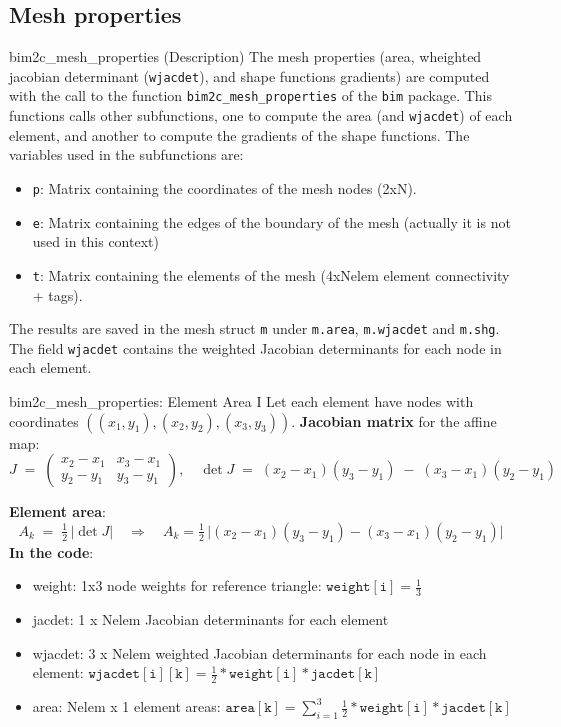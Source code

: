 \documentclass[aspectratio=54,xcolor=dvipsnames]{beamer}
\begin{document}
\subsection{Mesh properties}
\begin{frame}{bim2c\_mesh\_properties (Description)}
    The mesh properties (area, wheighted jacobian determinant (\texttt{wjacdet}), and shape functions gradients) are computed with the call to the function \texttt{bim2c\_mesh\_properties} of the \texttt{bim} package. This functions calls other subfunctions, one to compute the area (and \texttt{wjacdet}) of each element, and another to compute the gradients of the shape functions.
    The variables used in the subfunctions are:
    \begin{itemize}
        \item \texttt{p}: Matrix containing the coordinates of the mesh nodes (2xN).
        \item \texttt{e}: Matrix containing the edges of the boundary of the mesh (actually it is not used in this context)
        \item \texttt{t}: Matrix containing the elements of the mesh (4xNelem element connectivity + tags).
    \end{itemize}
    The results are saved in the mesh struct \texttt{m} under \texttt{m.area}, \texttt{m.wjacdet} and \texttt{m.shg}. The field \texttt{wjacdet} contains the weighted Jacobian determinants for each node in each element.
\end{frame}

\begin{frame}{bim2c\_mesh\_properties: Element Area I}
\small
Let each element have nodes with coordinates $((x_1,y_1), (x_2,y_2), (x_3,y_3))$.
\textbf{Jacobian matrix} for the affine map:
\[
    J \;=\;
    \begin{pmatrix}
        x_2 - x_1 & x_3 - x_1 \\[3pt]
        y_2 - y_1 & y_3 - y_1
    \end{pmatrix},
    \quad
    \det J \;=\;(x_2 - x_1)(y_3 - y_1)\;-\;(x_3 - x_1)(y_2 - y_1)
\]

\textbf{Element area}:
\[
    A_k \;=\;\tfrac12\,|\det J|
    \quad\Longrightarrow\quad
    A_k = \tfrac12\,\bigl|(x_2-x_1)(y_3-y_1)-(x_3-x_1)(y_2-y_1)\bigr|
\]
\textbf{In the code}:
\begin{itemize}
    \item weight: 1x3 node weights for reference triangle: $\mathtt{weight[i]} = \tfrac13$ 
    \item jacdet: 1 x Nelem Jacobian determinants for each element
    \item wjacdet: 3 x Nelem weighted Jacobian determinants for each node in each element: $\mathtt{wjacdet[i][k]} = \tfrac12 * \mathtt{weight[i]} * \mathtt{jacdet[k]}$ 
    \item area: Nelem x 1 element areas: $\mathtt{area[k]} = \sum_{i=1}^{3} \tfrac12 * \mathtt{weight[i]} * \mathtt{jacdet[k]}$
\end{itemize}
\end{frame}
\end{document}
